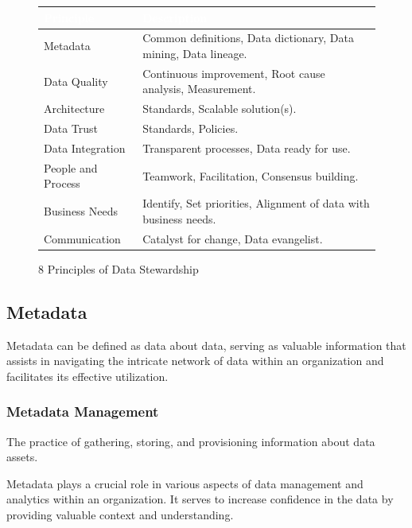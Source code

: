 \begin{figure}[H]
\begin{center}
    \renewcommand{\arraystretch}{1.5}
    \begin{tabular}{|>{\raggedright\arraybackslash}m{4cm}
                    |>{\raggedright\arraybackslash}m{8cm}
                    |}
    \hline
    \rowcolor[HTML]{196fb4}\centering\textcolor{white}{\large Principle} 
                            & \centering\textcolor{white}{\large Description} 
                            \tabularnewline 
    \hline
    Metadata & Common definitions, Data dictionary, Data mining, Data lineage. \\\hline
    Data Quality & Continuous improvement, Root cause analysis, Measurement. \\\hline
    Architecture & Standards, Scalable solution(s). \\\hline
    Data Trust & Standards, Policies. \\\hline
    Data Integration & Transparent processes, Data ready for use. \\\hline
    People and Process & Teamwork, Facilitation, Consensus building. \\\hline
    Business Needs & Identify, Set priorities, Alignment of data with business needs. \\\hline
    Communication & Catalyst for change, Data evangelist.\\\hline
    \end{tabular}
\end{center}
\caption{8 Principles of Data Stewardship}
\label{Data Steward's Job}
\end{figure}

\subsection{Metadata}
Metadata can be defined as data about data, serving as valuable information that assists in navigating the intricate network of data within an organization and facilitates its effective utilization.

\subsubsection{Metadata Management}
The practice of gathering, storing, and provisioning information about data assets.

Metadata plays a crucial role in various aspects of data management and analytics within an organization. It serves to increase confidence in the data by providing valuable context and understanding. 

